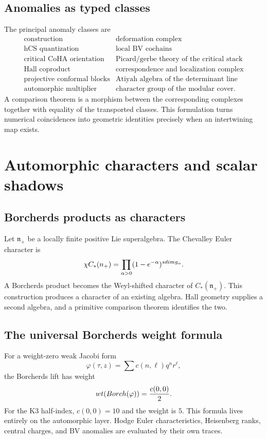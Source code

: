 \chapter{Anomalies as typed classes}
The principal anomaly classes are
\[
\begin{array}{c|c}
\text{construction}&\text{deformation complex}\\ \hline
\text{hCS quantization}&\text{local BV cochains}\\
\text{critical CoHA orientation}&\text{Picard/gerbe theory of the critical stack}\\
\text{Hall coproduct}&\text{correspondence and localization complex}\\
\text{projective conformal blocks}&\text{Atiyah algebra of the determinant line}\\
\text{automorphic multiplier}&\text{character group of the modular cover}.
\end{array}
\]
A comparison theorem is a morphism between the corresponding complexes together with equality of the transported classes. This formulation turns numerical coincidences into geometric identities precisely when an intertwining map exists.

\part[Automorphic forms]{Automorphic characters and scalar shadows}

\chapter{Borcherds products as characters}
Let $\mathfrak n_+$ be a locally finite positive Lie superalgebra. The Chevalley Euler character is
\[
 \chi C_*(n_+)
 =\prod_{\alpha>0}(1-e^{-\alpha})^{sdimg_\alpha}.
\]
A Borcherds product becomes the Weyl-shifted character of $C_*(\mathfrak n_+)$. This construction produces a character of an existing algebra. Hall geometry supplies a second algebra, and a primitive comparison theorem identifies the two.

\chapter{The universal Borcherds weight formula}
For a weight-zero weak Jacobi form
\[
 \varphi(\tau,z)=\sum c(n,\ell)q^nr^\ell,
\]
the Borcherds lift has weight
\[
 wt(Borch(\varphi))=\frac{c(0,0)}2.
\]
For the K3 half-index, $c(0,0)=10$ and the weight is $5$. This formula lives entirely on the automorphic layer. Hodge Euler characteristics, Heisenberg ranks, central charges, and BV anomalies are evaluated by their own traces.


